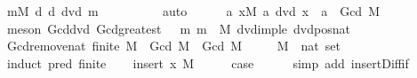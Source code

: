\begin{isabellebody}
\ {\isachardoublequoteopen}{\isacharparenleft}{\kern0pt}{\isasymInter}m{\isasymin}M{\isachardot}{\kern0pt}\ {\isacharbraceleft}{\kern0pt}d{\isachardot}{\kern0pt}\ d\ dvd\ m{\isacharbraceright}{\kern0pt}{\isacharparenright}{\kern0pt}\ {\isasymnoteq}\ {\isacharbraceleft}{\kern0pt}{\isacharbraceright}{\kern0pt}{\isachardoublequoteclose}\isanewline
\ \ \ \ \ \ \isamarkupfalse%
\ auto\isanewline
\ \ \ \ \isamarkupfalse%
\ {\isachardoublequoteopen}{\isasymAnd}a{\isachardot}{\kern0pt}\ {\isasymforall}x{\isasymin}M{\isachardot}{\kern0pt}\ a\ dvd\ x\ {\isasymLongrightarrow}\ a\ {\isasymle}\ Gcd\ M{\isachardoublequoteclose}\isanewline
\ \ \ \ \ \ \isamarkupfalse%
\ {\isacharparenleft}{\kern0pt}meson\ Gcd{\isacharunderscore}{\kern0pt}dvd\ Gcd{\isacharunderscore}{\kern0pt}greatest\ {\isacartoucheopen}{}\ {\isacharless}{\kern0pt}\ m{\isacartoucheclose}\ {\isacartoucheopen}m\ {\isasymin}\ M{\isacartoucheclose}\ dvd{\isacharunderscore}{\kern0pt}imp{\isacharunderscore}{\kern0pt}le\ dvd{\isacharunderscore}{\kern0pt}pos{\isacharunderscore}{\kern0pt}nat{\isacharparenright}{\kern0pt}\isanewline
\ \ \isamarkupfalse%
\isanewline
{}\isamarkupfalse%
%
\endisatagproof
{\isafoldproof}%
%
\isadelimproof
\isanewline
%
\endisadelimproof
\isanewline
{}\isamarkupfalse%
\ Gcd{\isacharunderscore}{\kern0pt}remove{}{\isacharunderscore}{\kern0pt}nat{\isacharcolon}{\kern0pt}\ {\isachardoublequoteopen}finite\ M\ {\isasymLongrightarrow}\ Gcd\ M\ {\isacharequal}{\kern0pt}\ Gcd\ {\isacharparenleft}{\kern0pt}M\ {\isacharminus}{\kern0pt}\ {\isacharbraceleft}{\kern0pt}{}{\isacharbraceright}{\kern0pt}{\isacharparenright}{\kern0pt}{\isachardoublequoteclose}\isanewline
\ \ \ M\ {\isacharcolon}{\kern0pt}{\isacharcolon}{\kern0pt}\ {\isachardoublequoteopen}nat\ set{\isachardoublequoteclose}\isanewline
%
\isadelimproof
%
\endisadelimproof
%
\isatagproof
{}\isamarkupfalse%
\ {\isacharparenleft}{\kern0pt}induct\ pred{\isacharcolon}{\kern0pt}\ finite{\isacharparenright}{\kern0pt}\isanewline
\ \ \isamarkupfalse%
\ {\isacharparenleft}{\kern0pt}insert\ x\ M{\isacharparenright}{\kern0pt}\isanewline
\ \ \isamarkupfalse%
\ \isamarkupfalse%
\ {\isacharquery}{\kern0pt}case\isanewline
\ \ \ \ \isamarkupfalse%
\ {\isacharparenleft}{\kern0pt}simp\ add{\isacharcolon}{\kern0pt}\ insert{\isacharunderscore}{\kern0pt}Diff{\isacharunderscore}{\kern0pt}if{\isacharparenright}{\kern0pt}\isanewline
{}\isamarkupfalse%

\end{isabellebody}
